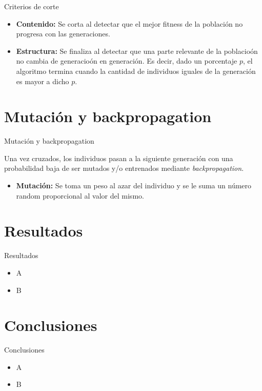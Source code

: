 \documentclass{beamer}
\begin{document}
\begin{frame}{Criterios de corte}
\begin{itemize}
\item \textbf{Contenido:} Se corta al detectar que el mejor fitness de la población no progresa con las generaciones.
\item \textbf{Estructura:} Se finaliza al detectar que una parte relevante de la poblacioón no cambia de generacioón en generación. Es decir, dado un porcentaje $p$, el algoritmo termina cuando la cantidad de individuos iguales de la generación es mayor a dicho $p$.
\end{itemize}
\end{frame}

\section{Mutación y backpropagation}
\begin{frame}{Mutación y backpropagation}

\par Una vez cruzados, los individuos pasan a la siguiente generación con una probabilidad baja de ser mutados y/o entrenados mediante \textit{backpropagation}.\\

\begin{itemize}
\item\textbf{Mutación:} Se toma un peso al azar del individuo y se le suma un número random proporcional al valor del mismo.
\end{itemize}
\end{frame}

\section{Resultados}
\begin{frame}{Resultados}

\begin{itemize}
\item A
\item B
\end{itemize}
\end{frame}


\section{Conclusiones}
\begin{frame}{Conclusiones}

\begin{itemize}
\item A
\item B
\end{itemize}

\end{frame}
\end{document}
